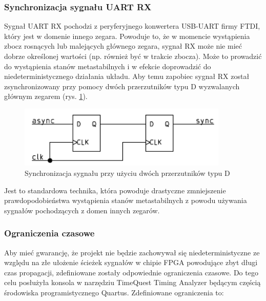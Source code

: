 \subsubsection{Synchronizacja sygnału UART RX}
\label{uart-sync}
Sygnał UART RX pochodzi z peryferyjnego konwertera USB-UART firmy FTDI, który jest w domenie innego zegara. Powoduje to, że w momencie wystąpienia zbocz rosnących lub malejących głównego zegara, sygnał RX może nie mieć dobrze określonej wartości (np. również być w trakcie zbocza). Może to prowadzić do wystąpienia stanów metastabilnych \cite{altera-metastability} i w efekcie doprowadzić do niedeterministycznego działania układu. Aby temu zapobiec sygnał RX został zsynchronizowany przy pomocy dwóch przerzutników typu D wyzwalanych głównym zegarem \cite{altera-metastability, 2ff-synchronization} (rys. \ref{fig:2ff}). 

\begin{figure}[!h]
\centering
\includegraphics[width=100mm,scale=1.5]{pictures/2ff.pdf}
\caption{Synchronizacja sygnału przy użyciu dwóch przerzutników typu D}
\label{fig:2ff}
\end{figure}

Jest to standardowa technika, która powoduje drastyczne zmniejszenie prawdopodobieństwa wystąpienia stanów metastabilnych z powodu używania sygnałów pochodzących z domen innych zegarów.

\subsubsection{Ograniczenia czasowe}
Aby mieć gwarancję, że projekt nie będzie zachowywał się niedeterministyczne ze względu na złe ułożenie ścieżek sygnałów w chipie FPGA powodujące zbyt długi czas propagacji, zdefiniowane zostały odpowiednie ograniczenia czasowe. Do tego celu posłużyła konsola w narzędziu TimeQuest Timing Analyzer będącym częścią środowiska programistycznego Quartus. Zdefiniowane ograniczenia to:

